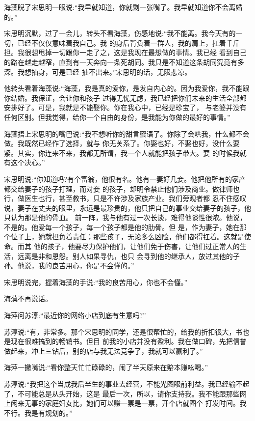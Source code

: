 \documentclass[11pt,a4paper,onecolumn]{article}
\begin{document}
海藻睨了宋思明一眼说:``我早就知道，你就剩一张嘴了。我早就知道你不会离婚的。''

宋思明沉默，过了一会儿，转头不看海藻，伤感地说:``我不能离。我今天有的一切，已经不仅仅意味着我自己。我
的身后背负着一群人，我的肩上，扛着千斤担。我很想甩掉一切跟你一走了之，这是我现在最想做的事情。我已经
看到自己的路在越走越窄，直到有一天奔向一条死胡同。我只是不知道这条胡同究竟有多深。我想抽身，可是已经
抽不出来。''宋思明的话，无限悲凉。

他转头看着海藻说:``海藻，我是真的爱你，是发自内心的。因为我爱你，我不能跟你结婚。我保证，会让你和孩子
过得无忧无虑，我已经把你们未来的生活全部都安排好了。可是，我就是不能娶你。你在我心中，已经是珍宝了，
与老婆并没有任何区别。但我觉得，给你一个自由的身份，是我能为你做的最好的事情。''

海藻捂上宋思明的嘴巴说:``我不想听你的甜言蜜语了。你除了会哄我，什么都不会做。我既然已经作了选择，就与
你无关系了。你娶也好，不娶也好，没什么要紧。其实，你连来不来，我都无所谓，我一个人就能把孩子带大。要
的时候我就有这个决心。''

宋思明说:``你知道吗?有个富翁，他很有名。他有一妻好几妾。他把他所有的家产都交给妻子的孩子打理，而对妾
的孩子，却明令禁止他们涉及商业。做律师也行，做医生也行，甚至教书，只是不许涉及家族产业。我们旁观者都
忍不住感叹说，妻子在丈夫的眼里，永远是最珍贵的，他只把自己的事业交给妻子的孩子，他只认为那是他的骨血。
前一阵，我与他有过一次长谈，难得他谈性很浓。他说，不是的。他爱每一个孩子，每一个孩子都是他的肋骨。但
是，作为妻子，她在那个位子上，她就担负着责任；那些孩子，无论多么凶险，他们都得扛着。这就是使命。而其
他的孩子，他要尽力保护他们，让他们免于伤害，让他们过正常人的生活，远离是非和恩怨。别人如果寻仇，也只
会寻到他的继承人，放过其他的子孙。他说，我的良苦用心，你是不会懂的。''

宋思明说完，握着海藻的手说:``我的良苦用心，你也不会懂。''

海藻不再说话。

海萍问苏淳:``最近你的网络小店到底有生意吗?''

苏淳说:``有，非常多。那个宋思明的同学，还是很帮忙的，给我的折扣很大，书也是现在很难搞到的畅销书。但目
前我的小店并没有盈利。我在做口碑，先把信誉做起来，冲上三钻后，别的店与我无法竞争了，我就可以赢利了。''

海萍一撇嘴说:``看你整天忙忙碌碌的，闹了半天原来在赔本赚吆喝。''

苏淳说:``我把这个当成我后半生的事业去经营，不能光图眼前利益。我已经输不起了，不可能总是从头开始，这是
最后一次，所以，请你支持我。我不能跟那些网上闲来无事的家庭妇女比，她们可以赚一票是一票，开个店就图个
打发时间。我不行。我是有规划的。''
\end{document}
